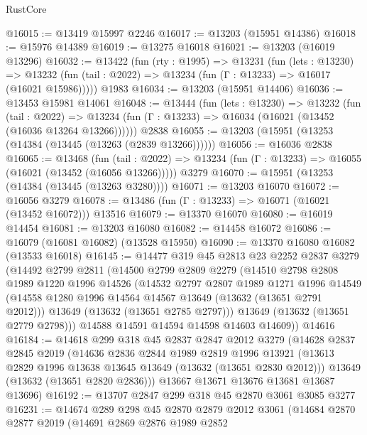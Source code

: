 \begin{lexlean}{RustCore}
\begin{coremodule}
@16015 := @13419 @15997 @2246
@16017 := @13203 (@15951 @14386)
@16018 := @15976 @14389
@16019 := @13275 @16018
@16021 := @13203 (@16019 @13296)
@16032 := @13422
    (fun (rty : @1995) =>
    @13231
      (fun (lets : @13230) =>
      @13232 (fun (tail : @2022) => @13234 (fun (Γ : @13233) => @16017 (@16021 @15986)))))
    @1983
@16034 := @13203 (@15951 @14406)
@16036 := @13453 @15981 @14061
@16048 := @13444
    (fun (lets : @13230) =>
    @13232
      (fun (tail : @2022) =>
      @13234 (fun (Γ : @13233) => @16034 (@16021 (@13452 (@16036 @13264 @13266))))))
    @2838
@16055 := @13203 (@15951 (@13253 (@14384 (@13445 (@13263 (@2839 @13266))))))
@16056 := @16036 @2838
@16065 := @13468
    (fun (tail : @2022) => @13234 (fun (Γ : @13233) => @16055 (@16021 (@13452 (@16056 @13266)))))
    @3279
@16070 := @15951 (@13253 (@14384 (@13445 (@13263 @3280))))
@16071 := @13203 @16070
@16072 := @16056 @3279
@16078 := @13486 (fun (Γ : @13233) => @16071 (@16021 (@13452 @16072))) @13516
@16079 := @13370 @16070
@16080 := @16019 @14454
@16081 := @13203 @16080
@16082 := @14458 @16072
@16086 := @16079 (@16081 @16082) (@13528 @15950)
@16090 := @13370 @16080 @16082 (@13533 @16018)
@16145 := @14477
    @319
    @45
    @2813
    @23
    @2252
    @2837
    @3279
    (@14492
      @2799
      @2811
      (@14500
        @2799
        @2809
        @2279
        (@14510
          @2798
          @2808
          @1989
          @1220
          @1996
          @14526
          (@14532
            @2797
            @2807
            @1989
            @1271
            @1996
            @14549
            (@14558 @1280 @1996 @14564 @14567 @13649 (@13632 (@13651 @2791 @2012)))
            @13649
            (@13632 (@13651 @2785 @2797)))
          @13649
          (@13632 (@13651 @2779 @2798)))
        @14588
        @14591
        @14594
        @14598
        @14603
        @14609))
    @14616
@16184 := @14618
    @299
    @318
    @45
    @2837
    @2847
    @2012
    @3279
    (@14628
      @2837
      @2845
      @2019
      (@14636
        @2836
        @2844
        @1989
        @2819
        @1996
        @13921
        (@13613 @2829 @1996 @13638 @13645 @13649 (@13632 (@13651 @2830 @2012)))
        @13649
        (@13632 (@13651 @2820 @2836)))
      @13667
      @13671
      @13676
      @13681
      @13687
      @13696)
@16192 := @13707 @2847 @299 @318 @45 @2870 @3061 @3085 @3277
@16231 := @14674
    @289
    @298
    @45
    @2870
    @2879
    @2012
    @3061
    (@14684
      @2870
      @2877
      @2019
      (@14691
        @2869
        @2876
        @1989
        @2852

\end{coremodule}
\end{lexlean}
